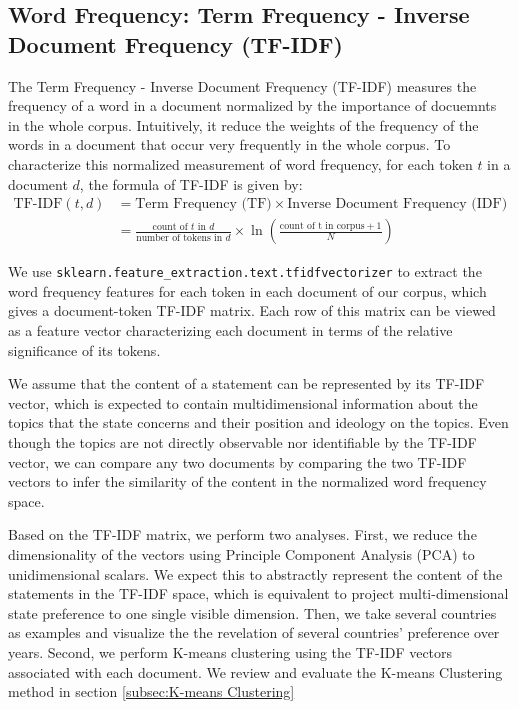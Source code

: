\documentclass[final,authoryear,3p,12pt,times,hidelinks]{elsarticle}
\begin{document}
\subsection{Word Frequency: Term Frequency - Inverse Document Frequency (TF-IDF)}
\label{sub:TF-IDF}
The Term Frequency - Inverse Document Frequency (TF-IDF) measures the frequency of a word in a document normalized by the importance of docuemnts in the whole corpus. Intuitively, it reduce the weights of the frequency of the words in a document that occur very frequently in the whole corpus. 
To characterize this normalized measurement of word frequency, for each token $t$ in a document $d$, the formula of TF-IDF is given by: 
\begin{equation}
  \begin{aligned}
    \text{TF-IDF}(t, d)
    &= \text{Term Frequency (TF)} \times \text{Inverse Document Frequency (IDF)} \\
    &= \frac{\text{count of }t \text{ in } d}{\text{number of tokens in }d} \times \ln(\frac{\mathrm{\text{count of }t\text{ in corpus}}+1}{N})
  \end{aligned}
\end{equation}

We use \texttt{sklearn.feature\_extraction.text.tfidfvectorizer} to extract the word frequency features for each token in each document of our corpus, which gives a document-token TF-IDF matrix. Each row of this matrix can be viewed as a feature vector characterizing each document in terms of the relative significance of its tokens. 

We assume that the content of a statement can be represented by its TF-IDF vector, which is expected to contain multidimensional information about the topics that the state concerns and their position and ideology on the topics. Even though the topics are not directly observable nor identifiable by the TF-IDF vector, we can compare any two documents by comparing the two TF-IDF vectors to infer the similarity of the content in the normalized word frequency space. 

Based on the TF-IDF matrix, we perform two analyses. First, we reduce the dimensionality of the vectors using Principle Component Analysis (PCA) to unidimensional scalars. We expect this to abstractly represent the content of the statements in the TF-IDF space, which is equivalent to project multi-dimensional state preference to one single visible dimension. Then, we take several countries as examples and visualize the the revelation of several countries' preference over years. Second, we perform K-means clustering using the TF-IDF vectors associated with each document. We review and evaluate the K-means Clustering method in section \ref{subsec:K-means Clustering}
\end{document}
